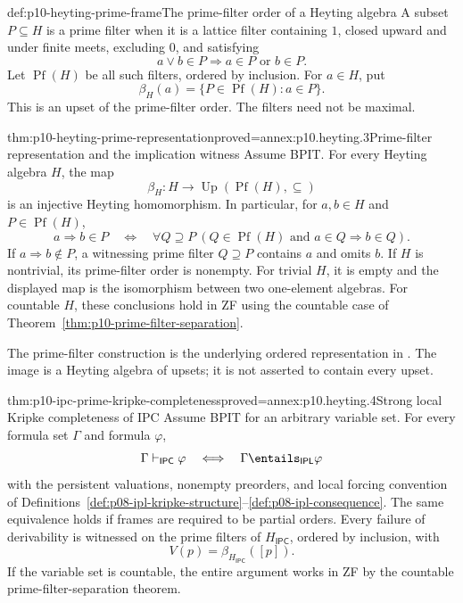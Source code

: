 \begin{hbdefinition}{def:p10-heyting-prime-frame}{The prime-filter order of a Heyting algebra}
A subset \(P\subseteq H\) is a prime filter when it is a lattice filter containing \(1\),
closed upward and under finite meets, excluding \(0\), and
satisfying
\[
 a\vee b\in P\Longrightarrow a\in P\text{ or }b\in P.
\]
Let \(\operatorname{Pf}(H)\) be all such filters, ordered by inclusion.
For \(a\in H\), put
\[
 \beta_H(a)=\{P\in\operatorname{Pf}(H):a\in P\}.
\]
This is an upset of the prime-filter order.
The filters need not be maximal.
\end{hbdefinition}

\begin{hbtheorem}{thm:p10-heyting-prime-representation}{proved=annex:p10.heyting.3}{Prime-filter representation and the implication witness}
Assume BPIT.  For every Heyting algebra \(H\), the map
\[
 \beta_H:H\longrightarrow
       \operatorname{Up}(\operatorname{Pf}(H),\subseteq)
\]
is an injective Heyting homomorphism.
In particular, for \(a,b\in H\) and \(P\in\operatorname{Pf}(H)\),
\[
 a\Rightarrow b\in P
 \quad\Longleftrightarrow\quad
 \forall Q\supseteq P\
       (Q\in\operatorname{Pf}(H)\text{ and }a\in Q
                     \Longrightarrow b\in Q).
\]
If \(a\Rightarrow b\notin P\), a witnessing prime filter
\(Q\supseteq P\) contains \(a\) and omits \(b\).
If \(H\) is nontrivial, its prime-filter order is nonempty.
For trivial \(H\), it is empty and the displayed map is the
isomorphism between two one-element algebras.
For countable \(H\), these conclusions hold in ZF using the
countable case of Theorem~\ref{thm:p10-prime-filter-separation}.
\end{hbtheorem}

The prime-filter construction is the underlying ordered
representation in
\cite[Theorem~2.3.3 and its proof sketch, p.~28]{Bezhanishvili2006Thesis}.
The image is a Heyting algebra of upsets; it is not asserted
to contain every upset.

\begin{hbtheorem}{thm:p10-ipc-prime-kripke-completeness}{proved=annex:p10.heyting.4}{Strong local Kripke completeness of IPC}
Assume BPIT for an arbitrary variable set.
For every formula set \(\Gamma\) and formula \(\varphi\),
\[
 \Gamma\vdash_{\mathsf{IPC}}\varphi
       \quad\Longleftrightarrow\quad
 \Gamma\entails_{\mathsf{IPL}}\varphi
\]
with the persistent valuations, nonempty preorders, and local
forcing convention of
Definitions~\ref{def:p08-ipl-kripke-structure}--\ref{def:p08-ipl-consequence}.
The same equivalence holds if frames are required to be partial orders.
Every failure of derivability is witnessed on the prime filters
of \(H_{\mathsf{IPC}}\), ordered by inclusion, with
\[
 V(p)=\beta_{H_{\mathsf{IPC}}}([p]).
\]
If the variable set is countable, the entire argument works in
ZF by the countable prime-filter-separation theorem.
\end{hbtheorem}
